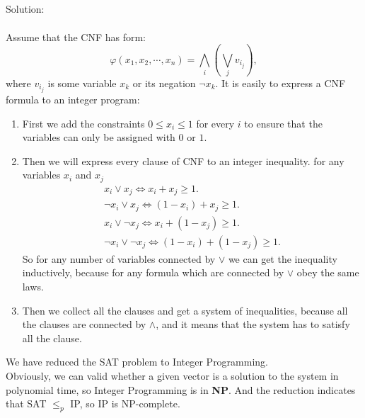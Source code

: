 \documentclass[a4papper]{article}
\theoremstyle{neosn}
\begin{document}
    \\

    \\

    \\

    \\

    Solution: \\

    \\
    Assume that the CNF has form:
    \[
        \varphi(x_1, x_2, \cdots , x_n) = \bigwedge_{i} \left( \bigvee_j v_{i_j} \right),
    \]
    where $v_{i_j}$ is some variable $x_k$ or its negation $\neg x_k$.
    It is easily to express a CNF formula to an integer program:
    \begin{enumerate}
        \item First we add the constraints $0 \leqslant x_i \leqslant 1$ for every $i$ to
        ensure that the variables can only be assigned with $0$ or $1$.
        \item Then we will express every clause of CNF to an integer inequality.
        for any variables $x_i$ and $x_j$
        \[
            \begin{array}{c}

            x_i \lor x_j \Leftrightarrow x_i + x_j \geqslant 1. \\
            \neg x_i \lor x_j \Leftrightarrow (1-x_i) + x_j \geqslant 1. \\
            x_i \lor \neg x_j \Leftrightarrow x_i+(1-x_j) \geqslant 1.\\
            \neg x_i \lor \neg x_j \Leftrightarrow (1-x_i) + (1 - x_j) \geqslant 1.
            \end{array}
        \]
        So for any number of variables connected by $\lor$ we can get the inequality inductively, because
        for any formula which are connected by $\lor$ obey the same laws.
        \item Then we collect all the clauses and get a system of inequalities, because all the clauses
        are connected by $\land$, and it means that the system has to satisfy all the clause.
    \end{enumerate}

    We have reduced the SAT problem to Integer Programming. \\

    Obviously, we can valid whether a given vector is a solution to the system in polynomial time,
    so Integer Programming is in \textbf{NP}.
    And the reduction indicates that SAT $\leqslant_p$ IP, so IP is NP-complete.
\end{document}
